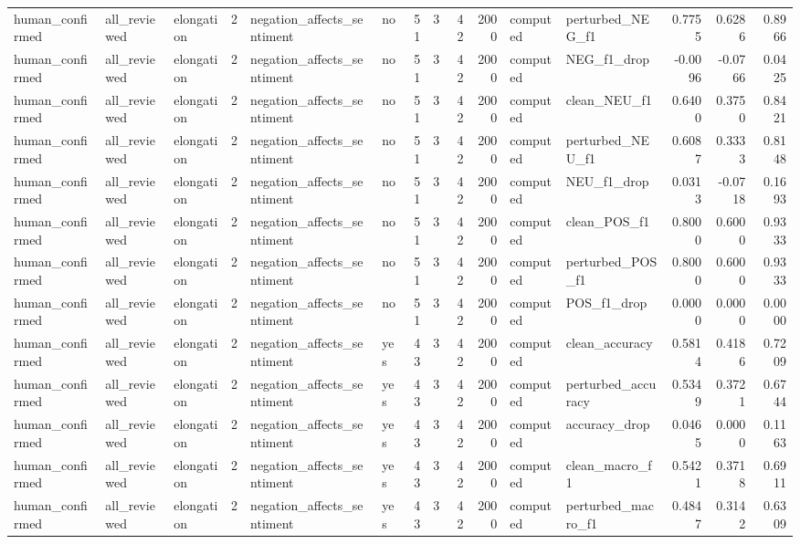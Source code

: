 \begin{tabular}{lllrllrrrrllrrr}
human_confirmed & all_reviewed & elongation & 2 & negation_affects_sentiment & no & 51 & 3 & 42 & 2000 & computed & perturbed_NEG_f1 & 0.7755 & 0.6286 & 0.8966 \\
human_confirmed & all_reviewed & elongation & 2 & negation_affects_sentiment & no & 51 & 3 & 42 & 2000 & computed & NEG_f1_drop & -0.0096 & -0.0766 & 0.0425 \\
human_confirmed & all_reviewed & elongation & 2 & negation_affects_sentiment & no & 51 & 3 & 42 & 2000 & computed & clean_NEU_f1 & 0.6400 & 0.3750 & 0.8421 \\
human_confirmed & all_reviewed & elongation & 2 & negation_affects_sentiment & no & 51 & 3 & 42 & 2000 & computed & perturbed_NEU_f1 & 0.6087 & 0.3333 & 0.8148 \\
human_confirmed & all_reviewed & elongation & 2 & negation_affects_sentiment & no & 51 & 3 & 42 & 2000 & computed & NEU_f1_drop & 0.0313 & -0.0718 & 0.1693 \\
human_confirmed & all_reviewed & elongation & 2 & negation_affects_sentiment & no & 51 & 3 & 42 & 2000 & computed & clean_POS_f1 & 0.8000 & 0.6000 & 0.9333 \\
human_confirmed & all_reviewed & elongation & 2 & negation_affects_sentiment & no & 51 & 3 & 42 & 2000 & computed & perturbed_POS_f1 & 0.8000 & 0.6000 & 0.9333 \\
human_confirmed & all_reviewed & elongation & 2 & negation_affects_sentiment & no & 51 & 3 & 42 & 2000 & computed & POS_f1_drop & 0.0000 & 0.0000 & 0.0000 \\
human_confirmed & all_reviewed & elongation & 2 & negation_affects_sentiment & yes & 43 & 3 & 42 & 2000 & computed & clean_accuracy & 0.5814 & 0.4186 & 0.7209 \\
human_confirmed & all_reviewed & elongation & 2 & negation_affects_sentiment & yes & 43 & 3 & 42 & 2000 & computed & perturbed_accuracy & 0.5349 & 0.3721 & 0.6744 \\
human_confirmed & all_reviewed & elongation & 2 & negation_affects_sentiment & yes & 43 & 3 & 42 & 2000 & computed & accuracy_drop & 0.0465 & 0.0000 & 0.1163 \\
human_confirmed & all_reviewed & elongation & 2 & negation_affects_sentiment & yes & 43 & 3 & 42 & 2000 & computed & clean_macro_f1 & 0.5421 & 0.3718 & 0.6911 \\
human_confirmed & all_reviewed & elongation & 2 & negation_affects_sentiment & yes & 43 & 3 & 42 & 2000 & computed & perturbed_macro_f1 & 0.4847 & 0.3142 & 0.6309 \\

\end{tabular}
